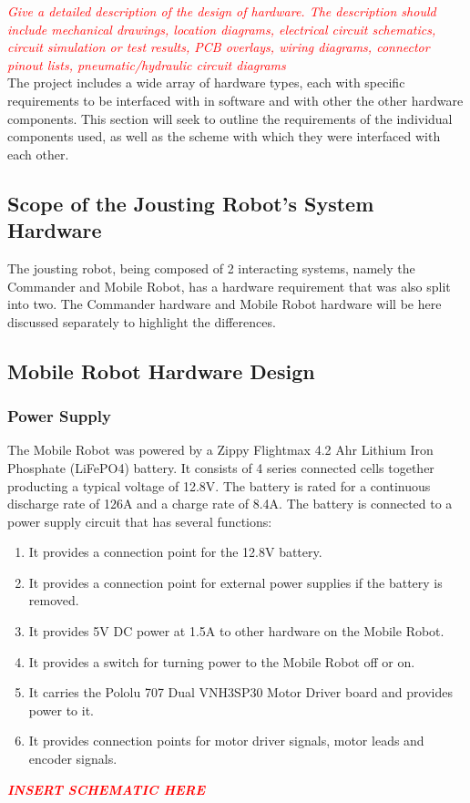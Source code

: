 \documentclass[11pt,a4paper]{article}
\begin{document}
  \textcolor{red}
  {
  \textit{Give a detailed description of the design of hardware. The description should include mechanical drawings, location diagrams, electrical circuit schematics, circuit simulation or test results, PCB overlays, wiring diagrams, connector pinout lists, pneumatic/hydraulic circuit diagrams}
  }
  \\The project includes a wide array of hardware types, each with specific requirements to be interfaced with in software and with other the other hardware components. This section will seek to outline the requirements of the individual components used, as well as the scheme with which they were interfaced with each other.

  \subsection{Scope of the Jousting Robot's System Hardware}
    The jousting robot, being composed of 2 interacting systems, namely the Commander and Mobile Robot, has a hardware requirement that was also split into two.
    The Commander hardware and Mobile Robot hardware will be here discussed separately to highlight the differences.

  \subsection{Mobile Robot Hardware Design}
    \subsubsection{Power Supply}
      The Mobile Robot was powered by a Zippy Flightmax 4.2 Ahr Lithium Iron Phosphate (LiFePO4) battery. It consists of 4 series connected cells together producting a typical voltage of 12.8V. The battery is rated for a continuous discharge rate of 126A and a charge rate of 8.4A. The battery is connected to a power supply circuit that has several functions:
      \begin{enumerate}
        \item It provides a connection point for the 12.8V battery.
        \item It provides a connection point for external power supplies if the battery is removed.
        \item It provides 5V DC power at 1.5A to other hardware on the Mobile Robot.
        \item It provides a switch for turning power to the Mobile Robot off or on.
        \item It carries the Pololu 707 Dual VNH3SP30 Motor Driver board and provides power to it.
        \item It provides connection points for motor driver signals, motor leads and encoder signals.
      \end{enumerate}
      \textcolor{red}
      {
      \textit{\textbf{INSERT SCHEMATIC HERE}}
      }
\end{document}
